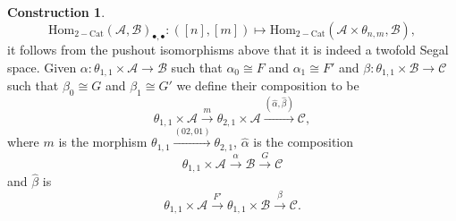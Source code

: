 \documentclass[a4paper, reqno]{amsart}
\theoremstyle{definition}
\newtheorem{construction}[theorem]{Construction}
\newcommand\cA{\mathscr A}
\newcommand\cB{\mathscr B}
\newcommand\cC{\mathscr C}
\newcommand\mor{\mathrm{Hom}}
\newcommand\cat{\mathrm{Cat}}
\begin{document}
\begin{construction}
\[\mor_{2-\cat}(\cA,\cB)_{\bullet,\bullet}:([n],[m])\mapsto\mor_{2-\cat}(\cA\times \theta_{n,m},\cB),\]
it follows from the pushout isomorphisms above that it is indeed a twofold Segal space. Given $\alpha:\theta_{1,1}\times\cA\rightarrow\cB$ such that $\alpha_0\cong F$ and $\alpha_1\cong F'$ and $\beta:\theta_{1,1}\times\cB\rightarrow\cC$ such that $\beta_0\cong G$ and $\beta_1\cong G'$ we define their composition to be 
\[\theta_{1,1}\times\cA\xrightarrow{m}\theta_{2,1}\times\cA\xrightarrow{(\widehat{\alpha},\widehat{\beta})}\cC,\]
where $m$ is the morphism $\theta_{1,1}\xrightarrow{(02,01)}\theta_{2,1}$, $\widehat{\alpha}$ is the composition
\[\theta_{1,1}\times\cA\xrightarrow{\alpha}\cB\xrightarrow{G}\cC\]
and $\widehat{\beta}$ is 
\[\theta_{1,1}\times\cA\xrightarrow{F'}\theta_{1,1}\times\cB\xrightarrow{\beta}\cC.\]
\end{construction}
\end{document}
